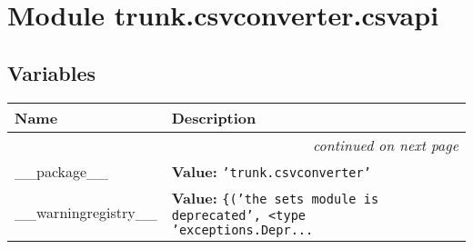 %
%
%


\section{Module trunk.csvconverter.csvapi}

    \label{trunk:csvconverter:csvapi}


  \subsection{Variables}

    \vspace{-1cm}
\hspace{\varindent}\begin{longtable}{|p{\varnamewidth}|p{\vardescrwidth}|l}
\cline{1-2}
\cline{1-2} \centering \textbf{Name} & \centering \textbf{Description}& \\
\cline{1-2}
\endhead\cline{1-2}\multicolumn{3}{r}{\small\textit{continued on next page}}\\\endfoot\cline{1-2}
\endlastfoot\raggedright \_\-\_\-p\-a\-c\-k\-a\-g\-e\-\_\-\_\- & \raggedright \textbf{Value:} 
{\tt \texttt{'}\texttt{trunk.csvconverter}\texttt{'}}&\\
\cline{1-2}
\raggedright \_\-\_\-w\-a\-r\-n\-i\-n\-g\-r\-e\-g\-i\-s\-t\-r\-y\-\_\-\_\- & \raggedright \textbf{Value:} 
{\tt \texttt{\{}\texttt{(}\texttt{'}\texttt{the sets module is deprecated}\texttt{'}\texttt{, }{\textless}type 'exceptions.Depr\texttt{...}}&\\
\cline{1-2}
\end{longtable}




